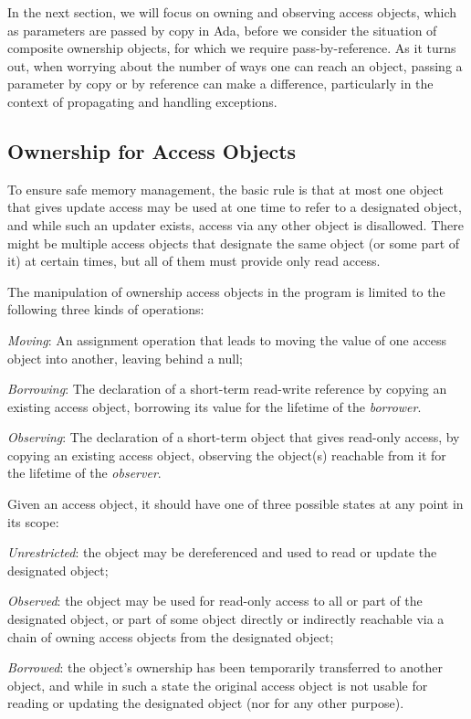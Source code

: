 \documentclass[runningheads]{llncs}
\begin{document}
In the next section, we will focus on owning and observing access objects, which as parameters are passed by copy in Ada, before we
consider the situation of composite ownership objects, for which we require pass-by-reference.  As it turns out, when worrying about the number of ways one can reach an object, passing a parameter by copy or by reference can make a difference, particularly in the context of propagating and handling exceptions.


\subsection{Ownership for Access Objects}
\label{subsec:ownershipAccess}

To ensure safe memory management, the basic rule is that at most one object that gives update access may be used at one time to refer to a designated object, and while such an updater exists, access via any other object is disallowed.  There might be multiple access objects that designate the same object (or some part of it) at certain times, but all of them must provide only read access.


The manipulation of ownership access objects in the program is limited to the following three kinds of operations:

\begin{compactitem}
  \item \textit{Moving}: An assignment operation that leads to moving the value of one access object into another, leaving behind a null;
  \item \textit{Borrowing}: The declaration of a short-term read-write reference by copying an existing access object, borrowing its value for the lifetime of the \textit{borrower}.
  \item \textit{Observing}: The declaration of a short-term object that gives read-only access, by copying an existing access object, observing the object(s) reachable from it for the lifetime of the \textit{observer}.
\end{compactitem}

Given an access object, it should have one of three possible states at any point in its scope:

\begin{compactitem}
  \item \textit {Unrestricted}: the object may be dereferenced and used to read or update the designated object;
  \item \textit {Observed}: the object may be used for read-only access to all or part of the designated object, or part of some object directly or indirectly reachable via a chain of owning access objects from the designated object;
  \item \textit {Borrowed}: the object's ownership has been temporarily transferred to another object,  and while in such a state the original access object is not usable for reading or updating the designated object (nor for any other purpose).
\end{compactitem}
\end{document}

